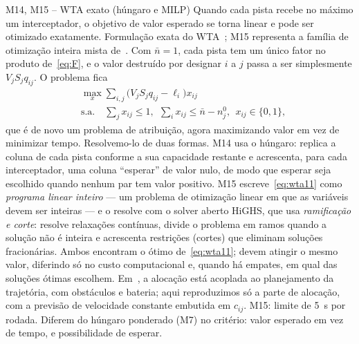 \begin{metodo}{M14, M15 -- WTA exato (húngaro e MILP)}
\ideia Quando cada pista recebe no máximo um interceptador, o objetivo de valor esperado se torna linear e pode ser
otimizado exatamente.
\orig Formulação exata do WTA~\cite{ahuja2007}; M15 representa a família de otimização inteira mista
de~\cite{afonso2020,cruz2025}.
\func Com $\bar n=1$, cada pista tem um único fator no produto de~\eqref{eq:F}, e o valor destruído por designar $i$ a $j$
passa a ser simplesmente $V_jS_jq_{ij}$. O problema fica
\begin{equation}
  \begin{aligned}
  &\max_{x}\sum_{i,j}\big(V_jS_jq_{ij}-\ell_i\big)x_{ij}\\
  &\text{s.a.}\quad\sum_jx_{ij}\le1,\ \ \sum_ix_{ij}\le\bar n-n_j^0,\ \ x_{ij}\in\{0,1\},
  \end{aligned}
  \label{eq:wta11}
\end{equation}
que é de novo um problema de atribuição, agora maximizando valor em vez de minimizar tempo. Resolvemo-lo de duas formas.
M14 usa o húngaro: replica a coluna de cada pista conforme a sua capacidade restante e acrescenta, para cada
interceptador, uma coluna ``esperar'' de valor nulo, de modo que esperar seja escolhido quando nenhum par tem valor
positivo. M15 escreve~\eqref{eq:wta11} como \emph{programa linear inteiro} --- um problema de otimização linear em que as
variáveis devem ser inteiras --- e o resolve com o solver aberto HiGHS, que usa \emph{ramificação e corte}: resolve
relaxações contínuas, divide o problema em ramos quando a solução não é inteira e acrescenta restrições (cortes) que
eliminam soluções fracionárias.
\prop Ambos encontram o ótimo de~\eqref{eq:wta11}; devem atingir o mesmo valor, diferindo só no custo computacional e,
quando há empates, em qual das soluções ótimas escolhem.
\adap Em~\cite{cruz2025}, a alocação está acoplada ao planejamento da trajetória, com obstáculos e bateria; aqui reproduzimos
só a parte de alocação, com a previsão de velocidade constante embutida em $c_{ij}$.
\parm M15: limite de 5~s por rodada.
\espera Diferem do húngaro ponderado (M7) no critério: valor esperado em vez de tempo, e possibilidade de esperar.
\end{metodo}

